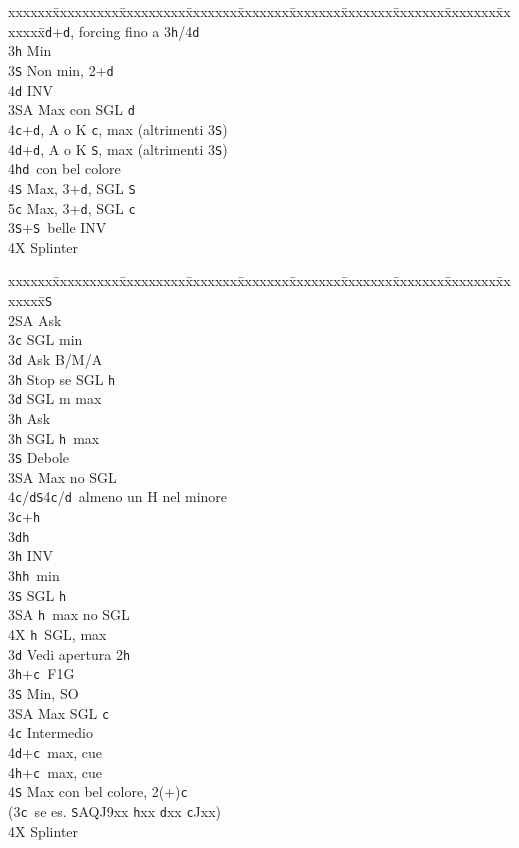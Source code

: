 \documentclass[a4paper,italian]{article}
\newcommand{\BS}{\small{\texttt{S}}}
\newcommand{\BC}{\small{\texttt{c}}}
\newcommand{\BD}{\small{\texttt{d}}}
\newcommand{\BH}{\small{\texttt{h}}}
\newenvironment{bidtable}
{\begin{tabbing}

    xxxxxx\=xxxxxxxxx\=xxxxxxxxx\=xxxxxxx\=xxxxxxx\=xxxxxxx\=xxxxxxx\=xxxxxxx\=xxxxxxx\=xxxxxxx\=\kill}
{\end{tabbing} }%
\begin{document}
\begin{multicols*}{2}
\begin{bidtable}
        3\BD {}+\BD, forcing fino a 3\BH/4\BD\+\\
        3\BH\> Min\\
        3\BS\> Non min, 2+\BD\+\\
        4\BD\> INV\-\\
        3\small{SA}\> Max con SGL \BD\\
        4\BC{}+\BD, A o K \BC, max (altrimenti 3\BS)\\
        4\BD{}+\BD, A o K \BS, max (altrimenti 3\BS)\\
        4\BH{}\BD\ con bel colore\\
        4\BS\> Max, 3+\BD, SGL \BS\\
        5\BC\> Max, 3+\BD, SGL \BC\-\\
        3\BS {}+\BS\ belle INV\\
        4X \> Splinter\-\\
    \end{bidtable}
    \vfill
    \parbox{\textwidth}{}
    \columnbreak

    \begin{bidtable}
        2\BS\+\\
        2\small{SA} \> Ask\+\\
        3\BC \> SGL min\+\\
        3\BD \> Ask B/M/A\\
        3\BH \> Stop se SGL \BH \-\\
        3\BD \> SGL m max\+\\
        3\BH \> Ask\-\\
        3\BH \> SGL \BH\ max\\
        3\BS \> Debole\\
        3\small{SA} \> Max no SGL\\
        4\BC/\BD {}\BS 4\BC /\BD\ almeno un H nel minore\-\\
        3\BC {}+\BH \+\\
        3\BD {}\BH \+\\
        3\BH \> INV\-\\
        3\BH {}\BH\ min\\
        3\BS \> SGL \BH \\
        3\small{SA} \BH\ max no SGL\\
        4X \BH\ SGL, max\-\\
        3\BD\> Vedi apertura 2\BH\\
        3\BH {}+\BC\ F1G\+\\
        3\BS \> Min, SO\\
        3\small{SA} \> Max SGL \BC\\
        4\BC \> Intermedio\\
        4\BD {}+\BC\ max, cue\\
        4\BH {}+\BC\ max, cue\\
        4\BS \> Max con bel colore, 2(+)\BC\+\\(3\BC\ se es. \BS AQJ9xx \BH xx \BD xx \BC Jxx)\-\-\\
        4X \> Splinter\-\\
    \end{bidtable}


\end{multicols*}
\end{document}
